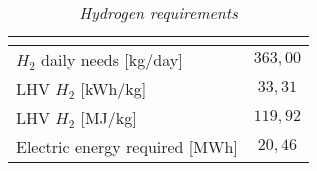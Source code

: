 \begin{table}[H]
\centering
\begin{tabular}{|lc|}
\hline
\multicolumn{2}{|c|}{\cellcolor{bluepoli!40}{\textbf{Hydrogen Requirements}}} \\ \hline
\multicolumn{1}{|l|}{$H_2$ daily needs {[}kg/day{]}}     & $363,00$           \\ \hline
\multicolumn{1}{|l|}{LHV $H_2$ {[}kWh/kg{]}}             & $33,31$            \\ \hline
\multicolumn{1}{|l|}{LHV $H_2$ {[}MJ/kg{]}}              & $119,92$           \\ \hline
\multicolumn{1}{|l|}{Electric energy required {[}MWh{]}} & $20,46$            \\ \hline
\end{tabular}
\caption{\textit{Hydrogen requirements}}
\label{tab:hydrogenrequirements}
\end{table}